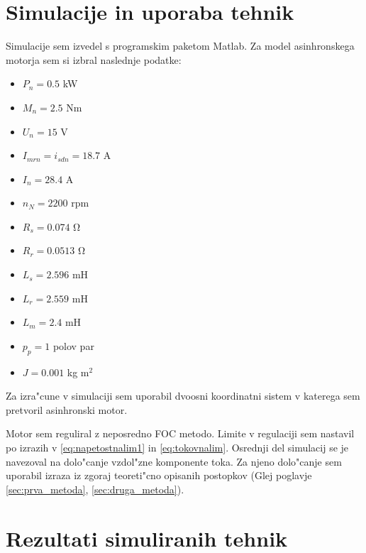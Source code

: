 \documentclass[journal,a4paper,twoside]{sty/IEEEtran}
\begin{document}
\section{Simulacije in uporaba tehnik}
Simulacije sem izvedel s programskim paketom Matlab. 
Za model asinhronskega motorja sem si izbral naslednje podatke:
\begin{itemize}
\item{$P_n=0.5$ kW}
\item{$M_n = 2.5$ Nm}
\item{$U_n = 15$ V}	
\item{$I_{mrn}= i_{sdn} = 18.7$ A}
\item{$I_n = 28.4$ A}
\item{$n_N = 2200$ rpm}
\item{$R_s = 0.074$ $\mathrm{\Omega}$}
\item{$R_r = 0.0513$ $\mathrm{\Omega}$}
\item{$L_s = 2.596$ mH}
\item{$L_r = 2.559$ mH}
\item{$L_m = 2.4$ mH}
\item{$p_p = 1$  polov par}
\item{$J = 0.001$ kg $\mathrm{m}^2$}
\end{itemize}

Za izra"cune v simulaciji sem uporabil dvoosni koordinatni sistem v katerega sem pretvoril asinhronski motor.




Motor sem reguliral z neposredno FOC metodo. Limite v regulaciji sem nastavil po izrazih v \ref{eq:napetostnalim1} in \ref{eq:tokovnalim}.
Osrednji del simulacij se je navezoval na dolo"canje vzdol"zne komponente toka. Za njeno dolo"canje sem uporabil izraza iz zgoraj teoreti"cno opisanih postopkov (Glej poglavje \ref{sec:prva_metoda}, \ref{sec:druga_metoda}).

\section{Rezultati simuliranih tehnik}
\end{document}

